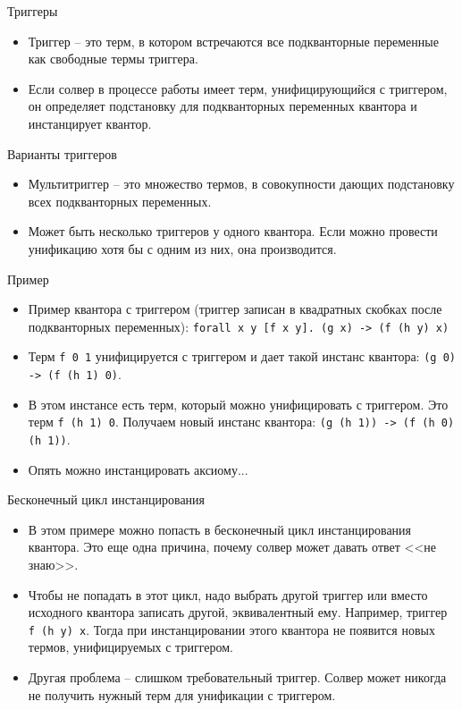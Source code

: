 \documentclass[hyperref={unicode=true}]{beamer}
\begin{document}
    \begin{frame}{Триггеры}
    \begin{itemize}
    \item
    Триггер -- это терм, в котором встречаются
    все подкванторные переменные как свободные термы триггера.
    \item
    Если солвер в процессе работы имеет терм, унифицирующийся с триггером,
    он определяет подстановку для подкванторных переменных квантора и
    инстанцирует квантор.
    \end{itemize}
    \end{frame}

    \begin{frame}{Варианты триггеров}
    \begin{itemize}
    \item
    Мультитриггер -- это множество термов, в совокупности дающих подстановку
    всех подкванторных переменных.
    \item
    Может быть несколько триггеров у одного квантора. Если можно провести
    унификацию хотя бы с одним из них, она производится.
    \end{itemize}
    \end{frame}

    \begin{frame}{Пример}
    \begin{itemize}
    \item
    Пример квантора с триггером (триггер записан в
            квадратных скобках после подкванторных переменных):
        \texttt{forall x y [f x y]. (g x) -> (f (h y) x)}
    \item
    Терм \texttt{f 0 1} унифицируется с триггером и дает такой
    инстанс квантора: \texttt{(g 0) -> (f (h 1) 0)}.
    \item
    В этом инстансе есть терм, который можно унифицировать с триггером.
    Это терм \texttt{f (h 1) 0}. Получаем новый инстанс квантора:
    \texttt{(g (h 1)) -> (f (h 0) (h 1))}.
    \item
    Опять можно инстанцировать аксиому...
    \end{itemize}
    \end{frame}

    \begin{frame}{Бесконечный цикл инстанцирования}
    \begin{itemize}
    \item
    В этом примере можно попасть в бесконечный цикл инстанцирования квантора.
    Это еще одна причина, почему солвер может давать ответ <<не знаю>>.
    \item
    Чтобы не попадать в этот цикл, надо выбрать другой триггер
    или вместо исходного квантора записать другой, эквивалентный ему. Например,
    триггер \texttt{f (h y) x}. Тогда при инстанцировании этого квантора
    не появится новых термов, унифицируемых с триггером.
    \item
    Другая проблема -- слишком требовательный триггер. Солвер может никогда
    не получить нужный терм для унификации с триггером.
    \end{itemize}
    \end{frame}
\end{document}
